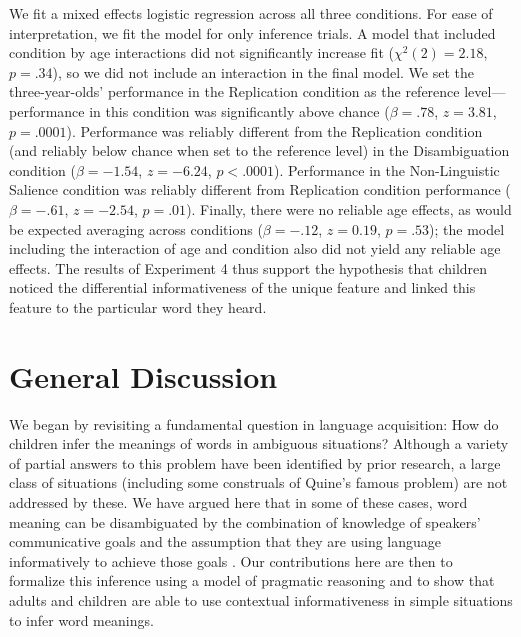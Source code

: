 \documentclass[man,noapacite]{apa2}
\begin{document}

We fit a mixed effects logistic regression across all three conditions. For ease of interpretation, we fit the model for only inference trials. A model that included condition by age interactions did not significantly increase fit ($\chi^2(2)=2.18$, $p = .34$), so we did not include an interaction in the final model. We set the three-year-olds' performance in the Replication condition as the reference level---performance in this condition was significantly above chance ($\beta=.78$, $z=3.81$, $p=.0001$). Performance was reliably different from the Replication condition (and reliably below chance when set to the reference level) in the Disambiguation condition ($\beta=-1.54$, $z=-6.24$, $p<.0001$). Performance in the Non-Linguistic Salience condition was reliably different from Replication condition performance ($\beta=-.61$, $z=-2.54$, $p=.01$). Finally, there were no reliable age effects, as would be expected averaging across conditions ($\beta=-.12$, $z=0.19$, $p=.53$); the model including the interaction of age and condition also did not yield any reliable age effects. The results of Experiment 4 thus support the hypothesis that children noticed the differential informativeness of the unique feature and linked this feature to the particular word they heard. 

\section{General Discussion}

We began by revisiting a fundamental question in language acquisition: How do children infer the meanings of words in ambiguous situations? Although a variety of partial answers to this problem have been identified by prior research, a large class of situations (including some construals of Quine's famous problem) are not addressed by these. We have argued here that in some of these cases, word meaning can be disambiguated by the combination of knowledge of speakers' communicative goals and the assumption that they are using language informatively to achieve those goals \cite{grice1975}. Our contributions here are then to formalize this inference using a model of pragmatic reasoning and to show that adults and children are able to use contextual informativeness in simple situations to infer word meanings.
\end{document}
